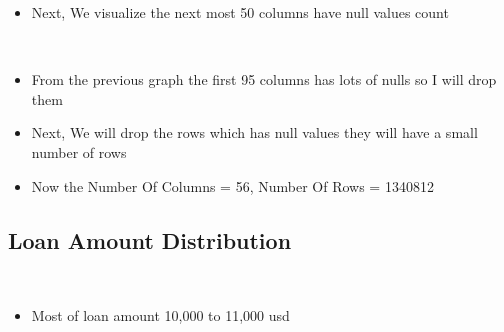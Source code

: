 \documentclass[11pt]{article}
\providecommand{\tightlist}{%
      \setlength{\itemsep}{0pt}\setlength{\parskip}{0pt}}
\begin{document}
    \begin{itemize}
\tightlist
\item
  Next, We visualize the next most 50 columns have null values count
\end{itemize}

    \begin{center}
    \end{center}
    { \hspace*{\fill} \\}
    
    \begin{itemize}
\tightlist
\item
  From the previous graph the first 95 columns has lots of nulls so I
  will drop them
\item
  Next, We will drop the rows which has null values they will have a
  small number of rows
\item
  Now the Number Of Columns = 56, Number Of Rows = 1340812
\end{itemize}

    \hypertarget{loan-amount-distribution}{%
\subsection{Loan Amount Distribution}\label{loan-amount-distribution}}

    \begin{center}
    \end{center}
    { \hspace*{\fill} \\}
    
    \begin{itemize}
\tightlist
\item
  Most of loan amount 10,000 to 11,000 usd
\end{itemize}

    \begin{center}
    \end{center}
    { \hspace*{\fill} \\}
    
    \begin{center}
    \end{center}
    { \hspace*{\fill} \\}
    
\end{document}
